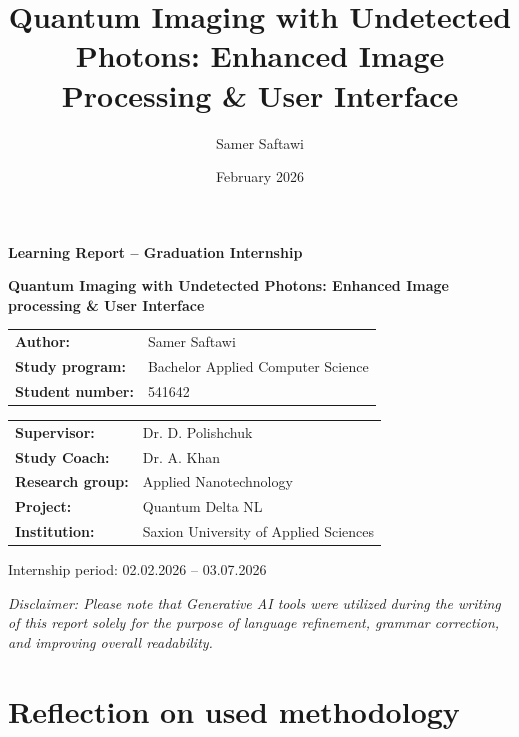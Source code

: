 \documentclass[12pt,a4paper]{article}
\title{Quantum Imaging with Undetected Photons: Enhanced Image Processing \& User Interface}
\author{Samer Saftawi}
\date{February 2026}
\begin{document}
\begin{titlepage}
\centering

\vspace*{2cm}

{\Large\bfseries Learning Report -- Graduation Internship\par}
\vspace{1.2cm}

{\Huge\bfseries Quantum Imaging with Undetected Photons: Enhanced Image processing \& User Interface\par}

\vspace{4cm}

{\large
\begin{tabular}{@{}l l@{}}
\textbf{Author:} & Samer Saftawi \\
\textbf{Study program:} & Bachelor Applied Computer Science \\
\textbf{Student number:} & 541642 \\
\end{tabular}
}

\vspace{1.5cm}

{\large
\begin{tabular}{@{}l l@{}}
\textbf{Supervisor:} & Dr. D. Polishchuk \\
\textbf{Study Coach:} & Dr. A. Khan \\
\textbf{Research group:} & Applied Nanotechnology \\
\textbf{Project:} & Quantum Delta NL \\
\textbf{Institution:} & Saxion University of Applied Sciences \\
\end{tabular}
}

\vfill

{\large
Internship period: 02.02.2026 -- 03.07.2026\\
}

\end{titlepage}

\newpage
\tableofcontents

\vfill

\begin{footnotesize}
\textit{Disclaimer: Please note that Generative AI tools were utilized during the writing of this report solely for the purpose of language refinement, grammar correction, and improving overall readability.}
\end{footnotesize}
\newpage

\section{Reflection on used methodology}
\end{document}
